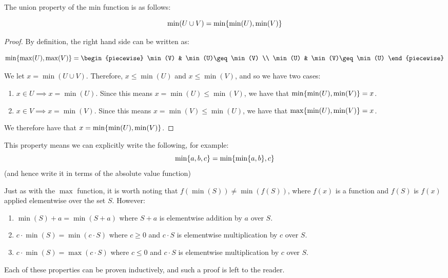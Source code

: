 \begin{theorem}
    The union property of the min function is as follows:

    $$
        \min(U\cup V)=\min\{\min(U),\min(V)\}
    $$

    \begin{proof}
        \label{proof:min}
        By definition, the right hand side can be written as:

        $$
            \min\br{\max(U),\max(V)}=\begin{piecewise}
                \min(V) & \min(U)\geq \min(V) \\
                \min(U) & \min(V)\geq \min(U)
            \end{piecewise}
        $$

        We let $x=\min(U\cup V)$. Therefore, $x\leq\min(U)$ and $x\leq\min(V)$, and so we have two cases:

        \begin{enumerate}
            \item $x\in U\implies x=\min(U)$. Since this means $x=\min(U)\leq\min(V)$, we have that $\min\{\min(U),\min(V)\}=x$.
            \item $x\in V\implies x=\min(V)$. Since this means $x=\min(V)\leq\min(U)$, we have that $\max\{\min(U),\min(V)\}=x$.
        \end{enumerate}

        We therefore have that $x=\min\{\min(U),\min(V)\}$.
    \end{proof}

    This property means we can explicitly write the following, for example:
    $$
        \min\{a,b,c\}=\min\{\min\{a,b\},c\}
    $$
    (and hence write it in terms of the absolute value function)
\end{theorem}

\begin{theorem}
    Just as with the $\max$ function, it is worth noting that $f(\min(S))\neq \min(f(S))$, where $f(x)$ is a function and $f(S)$ is $f(x)$ applied elementwise over the set $S$. However:

    \begin{enumerate}
        \item $\min(S)+a=\min(S+a)$ where $S+a$ is elementwise addition by $a$ over $S$.
        \item $c\cdot\min(S)=\min(c\cdot S)$ where $c\geq 0$ and $c\cdot S$ is elementwise multiplication by $c$ over $S$.
        \item $c\cdot\min(S)=\max(c\cdot S)$ where $c\leq 0$ and $c\cdot S$ is elementwise multiplication by $c$ over $S$.
    \end{enumerate}

    Each of these properties can be proven inductively, and such a proof is left to the reader.
\end{theorem}

